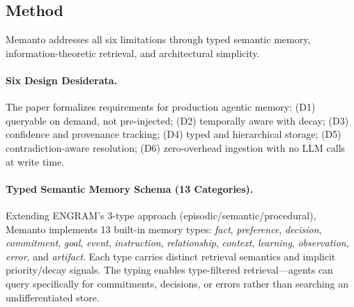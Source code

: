 \documentclass[11pt]{article}
\begin{document}
\subsection{Method}

Memanto addresses all six limitations through typed semantic memory, information-theoretic retrieval, and architectural simplicity.

\paragraph{Six Design Desiderata.}
The paper formalizes requirements for production agentic memory: (D1) queryable on demand, not pre-injected; (D2) temporally aware with decay; (D3) confidence and provenance tracking; (D4) typed and hierarchical storage; (D5) contradiction-aware resolution; (D6) zero-overhead ingestion with no LLM calls at write time.

\paragraph{Typed Semantic Memory Schema (13 Categories).}
Extending ENGRAM's 3-type approach (episodic/semantic/procedural), Memanto implements 13 built-in memory types: \emph{fact}, \emph{preference}, \emph{decision}, \emph{commitment}, \emph{goal}, \emph{event}, \emph{instruction}, \emph{relationship}, \emph{context}, \emph{learning}, \emph{observation}, \emph{error}, and \emph{artifact}. Each type carries distinct retrieval semantics and implicit priority/decay signals. The typing enables type-filtered retrieval---agents can query specifically for commitments, decisions, or errors rather than searching an undifferentiated store.
\end{document}

